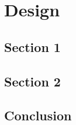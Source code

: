 

\chapter{Design}
\label{chap:design}

\lipsum[11]

\minitoc
\newpage

\section{Section 1}

\lipsum[12-13]

\section{Section 2}

\lipsum[14-15]

\section{Conclusion}

\lipsum[16-17]
